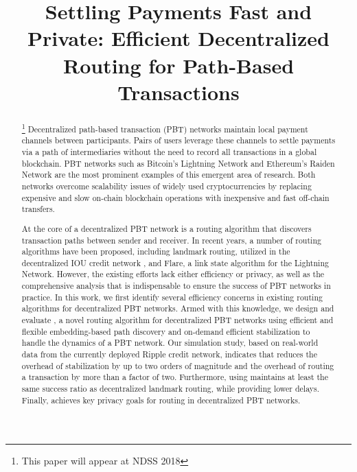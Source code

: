 \title{Settling Payments Fast and Private: Efficient Decentralized Routing for Path-Based Transactions}



\maketitle

\vspace{-1em}

\begin{abstract}
\footnote{This paper will appear at NDSS 2018} 
Decentralized path-based transaction (PBT)
networks maintain local payment channels between participants. Pairs of users 
leverage these channels to settle payments via a path of intermediaries
without the need to record all transactions in a global blockchain. 
PBT networks such as Bitcoin's Lightning Network and Ethereum's Raiden Network are the most prominent examples of
this emergent area of research. Both networks overcome scalability issues of widely used  
cryptocurrencies by replacing expensive and slow on-chain blockchain operations with inexpensive and fast off-chain transfers.

At the core of a decentralized PBT network is a routing algorithm that discovers transaction paths between sender and receiver.
 In recent years, a number of routing algorithms have been proposed, 
including landmark routing, utilized in the decentralized IOU credit network \cnsysname,  and Flare, a link state algorithm for the Lightning Network.
However, the existing efforts lack either efficiency or privacy, 
as well as the comprehensive analysis that is indispensable to ensure the success of PBT networks in practice. 
In this work, we first identify several efficiency concerns in existing 
routing algorithms for decentralized PBT networks.
Armed with this knowledge,
we design and evaluate \oursys , a novel routing algorithm for decentralized PBT networks 
using efficient and flexible embedding-based path discovery and on-demand 
efficient stabilization to handle the dynamics of a PBT network. Our simulation study,
based on real-world data from the currently deployed Ripple credit network, 
indicates that \oursys reduces the overhead of stabilization by 
up to two orders of magnitude and the overhead of routing a transaction by more than a factor of two. 
Furthermore, using \oursys maintains at least the same success 
ratio as decentralized landmark routing, while providing lower delays.
Finally, \oursys achieves key privacy goals for routing in decentralized PBT networks.   
\end{abstract}

